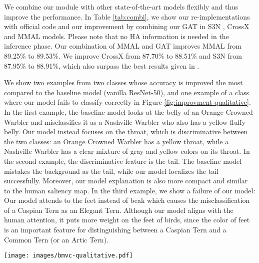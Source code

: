 \documentclass{bmvc2k}
\begin{document}
We combine our module with other state-of-the-art models flexibly and thus improve the performance. In Table \ref{tab:combi}, we show our re-implementations with official code and our improvement by combining our GAT in S3N \cite{ding2019selective}, CrossX \cite{luowei@19iccv} and MMAL \cite{zhang2021multi} models. Please note that no HA information is needed in the inference phase. Our combination of MMAL and GAT improves MMAL from 89.25\% to 89.53\%. We improve CrossX from 87.70\% to 88.51\% and S3N from 87.95\% to 88.91\%, which also surpass the best results given in \cite{ding2019selective,luowei@19iccv}. 



 We show two examples from two classes whose accuracy is improved the most compared to the baseline model (vanilla ResNet-50), and one example of a class where our model fails to classify correctly  in Figure \ref{fig:improvment qualitative}. In the first example, the baseline model looks at the belly of an Orange Crowned Warbler and misclassifies it as a Nashville Warbler who also has a yellow fluffy belly. Our model instead focuses on the throat, which is discriminative between the two classes: an Orange Crowned Warbler has a yellow throat, while a Nashville Warbler has a clear mixture of gray and yellow colors on its throat. In the second example, the discriminative feature is the tail. The baseline model mistakes the background as the tail, while our model localizes the tail successfully. Moreover, our model explanation is also more compact and similar to the human saliency map. In the third example, we show a failure of our model: Our model attends to the feet instead of beak which causes the misclassification of a Caspian Tern as an Elegant Tern. Although our model aligns with the human attention, it puts more weight on the feet of birds, since the color of feet is an important feature for distinguishing between a Caspian Tern and a Common Tern (or an Artic Tern). 


\begin{figure*}
    \centering
    \texttt{[image: images/bmvc-qualitative.pdf]}
    \vspace{0.1cm}
    \caption{Illustration of model explanations using HA. Two improved examples and one failure example of our model are shown. For each example, we show the input and misclassification classes; HA saliency map, model explanation of our model, and the baseline model.}

    \label{fig:improvment qualitative}
\end{figure*}
\end{document}
